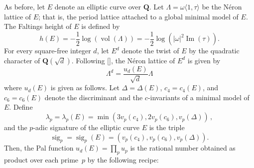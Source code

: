 \documentclass[
  journal=small,
  manuscript=article-type,  %
  year=2020,
  volume=37,
]{cup-journal}
\begin{document}
As before, let $E$ denote an elliptic curve over $\mathbf{Q}$. Let $\Lambda=\omega \langle 1, \tau \rangle$ be the Néron lattice of $E$; that is, the period 
lattice attached to a global minimal model of $E$. The Faltings height of $E$ is defined by
$$
h(E) = -\frac{1}{2} \log ( \operatorname{vol}(\Lambda) )=
-\frac{1}{2} \log ( |\omega|^2 \operatorname{Im}(\tau) ).
$$
For every square-free integer $d$,
let $E^d$ denote the twist of $E$ by the quadratic character of $\mathbf{Q}(\sqrt{d})$. Following [\cite{PAL}], the Néron lattice of $E^d$ is given by
$$
\Lambda^d = 
\displaystyle{\frac{u_d(E)}{\sqrt{d}}} \Lambda
$$
where $u_d(E)$ is given as follows. Let $\Delta=\Delta(E)$, 
$c_4=c_4(E)$, and $c_6=c_6(E)$ denote the discriminant and the $c$-invariants of a minimal model of $E$. Define
$$\lambda_p=\lambda_p(E)=\operatorname{min}(3v_p(c_4),2v_p(c_6),v_p(\Delta))
\,,$$ and the $p$-adic signature of the elliptic curve $E$ is
the triple 
$$
\operatorname{sig}_p=\operatorname{sig}_p(E)=(v_p(c_4), v_p(c_6), v_p(\Delta)).
$$
Then, the Pal function 
$u_d(E)=\prod_p u_p$ is the rational number obtained as product over each prime~$p$ by the following recipe: 
\end{document}
